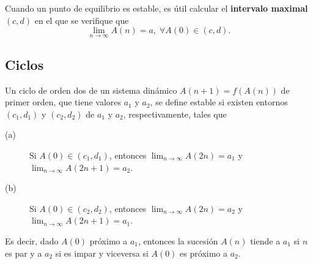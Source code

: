 \begin{observation}
\normalfont Cuando un punto de equilibrio es estable, es útil calcular el \textbf{intervalo maximal} $\displaystyle \left(c,d\right) $ en el que se verifique que
\[\lim_{n \to \infty}A\left(n\right) = a, \; \forall A\left(0\right) \in \left(c,d\right) .\]
\end{observation}
\subsection{Ciclos}
\begin{fdefinition}[]
\normalfont Un ciclo de orden dos de un sistema dinámico $\displaystyle A\left(n+1\right) = f\left(A\left(n\right)\right) $ de primer orden, que tiene valores $\displaystyle a_{1} $ y $\displaystyle a_{2} $, se define estable si existen entornos $\displaystyle \left(c_{1}, d _{1}\right) $ y $\displaystyle \left(c_{2}, d _{2}\right) $ de $\displaystyle a_{1} $ y $\displaystyle a_{2} $, respectivamente, tales que
\begin{description}
\item[(a)] Si $\displaystyle A\left(0\right) \in \left(c_{1}, d _{1}\right) $, entonces $\displaystyle \lim_{n \to \infty}A\left(2n\right) = a_{1} $ y $\displaystyle \lim_{n \to \infty}A\left(2n+1\right) = a_{2} $.
\item[(b)] Si $\displaystyle A\left(0\right) \in \left(c_{2},d _{2}\right) $, entonces $\displaystyle \lim_{n \to \infty}A\left(2n\right) = a_{2} $ y $\displaystyle \lim_{n \to \infty}A\left(2n+1\right)=a_{1} $.
\end{description}
\end{fdefinition}
\begin{observation}
\normalfont Es decir, dado $\displaystyle A\left(0\right) $ próximo a $\displaystyle a_{1} $, entonces la sucesión $\displaystyle A\left(n\right) $ tiende a $\displaystyle a_{1} $ si $\displaystyle n $ es par y a $\displaystyle a_{2} $ si es impar y viceversa si $\displaystyle A\left(0\right) $ es próximo a $\displaystyle a_{2} $.
\end{observation}
